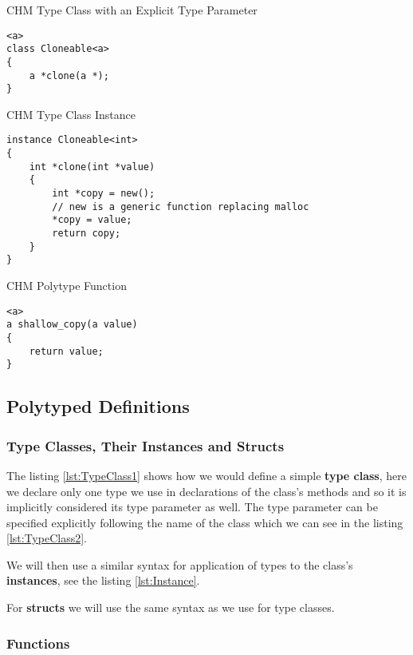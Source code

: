\begin{listing}
\caption{CHM Type Class with an Explicit Type Parameter}
\label{lst:TypeClass2}
\begin{lstlisting}
<a>
class Cloneable<a>
{
    a *clone(a *);
}
\end{lstlisting}
\end{listing}

\begin{listing}
\caption{CHM Type Class Instance}
\label{lst:Instance}
\begin{lstlisting}
instance Cloneable<int>
{
    int *clone(int *value)
    {
        int *copy = new();
        // new is a generic function replacing malloc
        *copy = value;
        return copy;
    }
}
\end{lstlisting}
\end{listing}

\begin{listing}
\caption{CHM Polytype Function}
\label{lst:Function}
\begin{lstlisting}
<a>
a shallow_copy(a value)
{
    return value;
}
\end{lstlisting}
\end{listing}

\subsection{Polytyped Definitions}


\subsubsection{Type Classes, Their Instances and Structs}

The listing \ref{lst:TypeClass1} shows how we would define a simple \textbf{type class}, here we declare only one type we use in declarations of the class's methods and so it is implicitly considered its type parameter as well. The type parameter can be specified explicitly following the name of the class which we can see in the listing \ref{lst:TypeClass2}.

We will then use a similar syntax for application of types to the class's \textbf{instances}, see the listing \ref{lst:Instance}.

For \textbf{structs} we will use the same syntax as we use for type classes.

\subsubsection{Functions}

